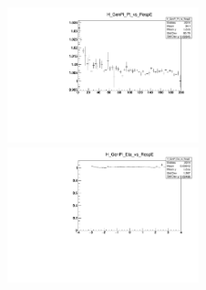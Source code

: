 
\begin{figure}
\includegraphics[width=0.495\textwidth]{./plots_pdf/ECAL_plots/Prod6/NoPU/H_GenPi_Pt_vs_RespE.pdf}
\includegraphics[width=0.495\textwidth]{./plots_pdf/ECAL_plots/Prod6/NoPU/H_GenPi_Eta_vs_RespE.pdf}
\caption [NoPU - HLT vs offline PF ECAL cluster]{}
\label{fig:NoPU_ECAL_Offline_vs_Online_E}
\end{figure}

